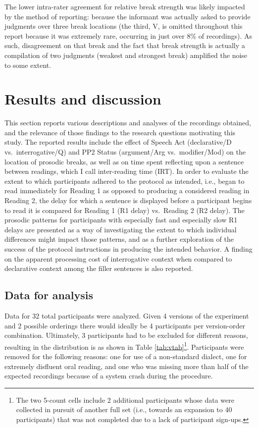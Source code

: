 \documentclass[12pt,oneside]{book}
\let\rmarkdownfootnote\footnote%
\def\footnote{\protect\rmarkdownfootnote}
\begin{document}
The lower intra-rater agreement for relative break strength was likely impacted by the method of reporting: because the informant was actually asked to provide judgments over three break locations (the third, V, is omitted throughout this report because it was extremely rare, occurring in just over 8\% of recordings). As such, disagreement on that break and the fact that break strength is actually a compilation of two judgments (weakest and strongest break) amplified the noise to some extent.

\hypertarget{res}{%
\chapter{Results and discussion}\label{res}}

This section reports various descriptions and analyses of the recordings obtained, and the relevance of those findings to the research questions motivating this study. The reported results include the effect of Speech Act (declarative/D vs.~interrogative/Q) and PP2 Status (argument/Arg vs.~modifier/Mod) on the location of prosodic breaks, as well as on time spent reflecting upon a sentence between readings, which I call inter-reading time (IRT). In order to evaluate the extent to which participants adhered to the protocol as intended, i.e., began to read immediately for Reading 1 as opposed to producing a considered reading in Reading 2, the delay for which a sentence is displayed before a participant begins to read it is compared for Reading 1 (R1 delay) vs.~Reading 2 (R2 delay). The prosodic patterns for participants with especially fast and especially slow R1 delays are presented as a way of investigating the extent to which individual differences might impact those patterns, and as a further exploration of the success of the protocol instructions in producing the intended behavior. A finding on the apparent processing cost of interrogative context when compared to declarative context among the filler sentences is also reported.

\hypertarget{data-for-analysis}{%
\section{Data for analysis}\label{data-for-analysis}}

Data for 32 total participants were analyzed. Given 4 versions of the experiment and 2 possible orderings there would ideally be 4 participants per version-order combination. Ultimately, 3 participants had to be excluded for different reasons, resulting in the distribution is as shown in Table \ref{tab:vtab}\footnote{The two 5-count cells include 2 additional participants whose data were collected in pursuit of another full set (i.e., towards an expansion to 40 participants) that was not completed due to a lack of participant sign-ups.}. Participants were removed for the following reasons: one for use of a non-standard dialect, one for extremely disfluent oral reading, and one who was missing more than half of the expected recordings because of a system crash during the procedure.
\end{document}
